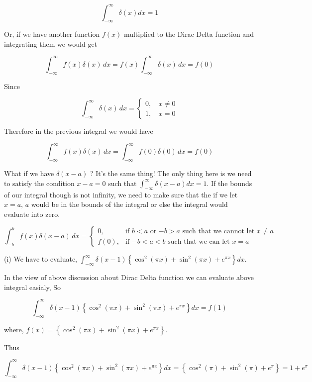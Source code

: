 \documentclass[12pt, a4paper]{article} %
\begin{document}
\[\int_{-\infty}^\infty \delta(x) dx = 1\]

Or, if we have another function $f(x)$ multiplied to the Dirac Delta function and integrating them we would get

\[\int_{-\infty}^{\infty} f(x) \delta(x) \, dx = f(x) \int_{-\infty}^\infty \delta(x) \, dx = f(0)\]

Since

\[\int_{-\infty}^\infty \delta(x) \, dx = \begin{cases}
    0, \, & x \ne 0 \\
    1, \, & x = 0 \end{cases}\]

Therefore in the previous integral we would have    

\[\int_{-\infty}^\infty f(x)\delta(x) \, dx = \int_{-\infty}^\infty f(0)\delta(0) \, dx = f(0)\]

What if we have $\delta(x-a)$ ? It's the same thing! The only thing here is we need to satisfy the condition $x-a=0$
such that $\displaystyle \int_{-\infty}^{\infty}\delta(x-a)dx = 1$. If the bounds of our integral though is not infinity, we need to make sure that the if we let $x=a$, $a$ would be in the bounds of the integral or else the integral would evaluate into zero.

\BgThispage
\[\int_{-b}^b f(x)\delta(x-a) \, dx = \begin{cases}
    0, & \text{if $b<a$ or $-b >a$ such that we cannot let $x \ne a$} \\
    f(0), & \text{if $-b<a<b$ such that we can let $x = a$}
    \end{cases}\]

\vspace*{1cm}   

(i) We have to evaluate, $\displaystyle \int_{-\infty}^{\infty}\delta(x-1)\left\{\cos^2(\pi x) + \sin^2(\pi x)+ e^{\pi x}\right\}dx$.

In the view of above discussion about Dirac Delta function we can evaluate above integral easialy, So

\[\int_{-\infty}^{\infty}\delta(x-1)\left\{\cos^2(\pi x) + \sin^2(\pi x)+ e^{\pi x}\right\}dx = f(1)\]

where, $\displaystyle f(x) = \left\{\cos^2(\pi x) + \sin^2(\pi x)+ e^{\pi x}\right\}$.

Thus 

\[\int_{-\infty}^{\infty}\delta(x-1)\left\{\cos^2(\pi x) + \sin^2(\pi x)+ e^{\pi x}\right\}dx = \left\{\cos^2(\pi) + \sin^2(\pi)+ e^{\pi}\right\} = 1 + e^\pi\]
\end{document}
